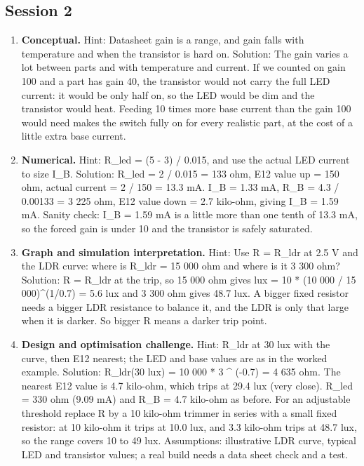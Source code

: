 \documentclass[11pt,a4paper]{article}
\begin{document}
\subsection*{Session 2}
\begin{enumerate}[nosep]
\item \textbf{Conceptual.} Hint: Datasheet gain is a range, and gain falls with temperature and when the transistor is hard on. Solution: The gain varies a lot between parts and with temperature and current. If we counted on gain 100 and a part has gain 40, the transistor would not carry the full LED current: it would be only half on, so the LED would be dim and the transistor would heat. Feeding 10 times more base current than the gain 100 would need makes the switch fully on for every realistic part, at the cost of a little extra base current.
\item \textbf{Numerical.} Hint: R\_led = (5 - 3) / 0.015, and use the actual LED current to size I\_B. Solution: R\_led = 2 / 0.015 = 133 ohm, E12 value up = 150 ohm, actual current = 2 / 150 = 13.3 mA. I\_B = 1.33 mA, R\_B = 4.3 / 0.00133 = 3 225 ohm, E12 value down = 2.7 kilo-ohm, giving I\_B = 1.59 mA. Sanity check: I\_B = 1.59 mA is a little more than one tenth of 13.3 mA, so the forced gain is under 10 and the transistor is safely saturated.
\item \textbf{Graph and simulation interpretation.} Hint: Use R = R\_ldr at 2.5 V and the LDR curve: where is R\_ldr = 15 000 ohm and where is it 3 300 ohm? Solution: R = R\_ldr at the trip, so 15 000 ohm gives lux = 10 * (10 000 / 15 000)\textasciicircum{}(1/0.7) = 5.6 lux and 3 300 ohm gives 48.7 lux. A bigger fixed resistor needs a bigger LDR resistance to balance it, and the LDR is only that large when it is darker. So bigger R means a darker trip point.
\item \textbf{Design and optimisation challenge.} Hint: R\_ldr at 30 lux with the curve, then E12 nearest; the LED and base values are as in the worked example. Solution: R\_ldr(30 lux) = 10 000 * 3 \textasciicircum{} (-0.7) = 4 635 ohm. The nearest E12 value is 4.7 kilo-ohm, which trips at 29.4 lux (very close). R\_led = 330 ohm (9.09 mA) and R\_B = 4.7 kilo-ohm as before. For an adjustable threshold replace R by a 10 kilo-ohm trimmer in series with a small fixed resistor: at 10 kilo-ohm it trips at 10.0 lux, and 3.3 kilo-ohm trips at 48.7 lux, so the range covers 10 to 49 lux. Assumptions: illustrative LDR curve, typical LED and transistor values; a real build needs a data sheet check and a test.
\end{enumerate}
\end{document}
